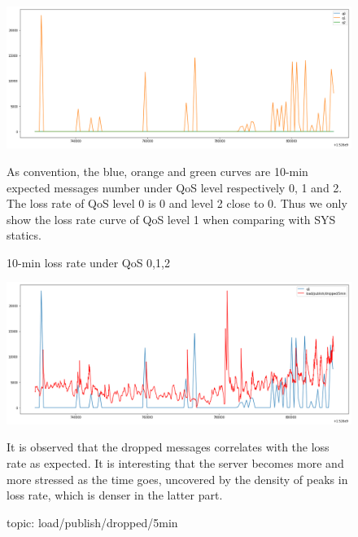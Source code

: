 \documentclass[12pt, letterpaper]{article}
\begin{document}
\FloatBarrier
\begin{figure}
	\setlength{\tabcolsep}{0pt}
	\caption{10-min loss rate under QoS 0,1,2}
	\label{f:loss_cnt}
	\begin{center}		
		\includegraphics[width=\textwidth]{loss_cnt/loss} 
	\end{center}
	As convention, the blue, orange and green curves are 10-min expected messages number under QoS level respectively 0, 1 and 2. The loss rate of QoS level 0 is 0 and level 2 close to 0. Thus we only show the loss rate curve of QoS level 1 when comparing with SYS statics.
\end{figure}

\begin{figure}
	\setlength{\tabcolsep}{0pt}
	\caption{topic: load/publish/dropped/5min}
	\label{f:loss_cnt_load_publish_dropped_5min}
	\begin{center}
		
		\includegraphics[width=\textwidth]{loss_cnt/loss-load_publish_dropped_5min}
		
	\end{center}
	It is observed that the dropped messages correlates with the loss rate as expected. It is interesting that the server becomes more and more stressed as the time goes, uncovered by the density of peaks in loss rate, which is denser in the latter part.
\end{figure}
\end{document}
